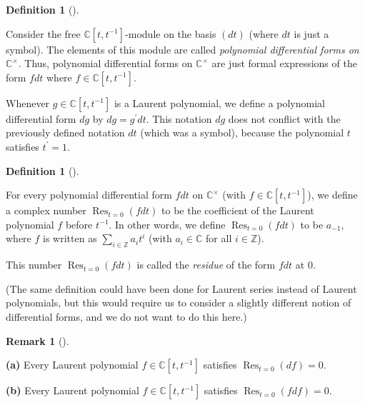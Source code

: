 \documentclass
[numbers=enddot,12pt,final,onecolumn,german,notitlepage]{scrartcl}%
\theoremstyle{definition}
\newtheorem{defi}[theo]{Definition}
\newenvironment{definition}[1][]
{\begin{defi}[#1]\begin{leftbar}}
{\end{leftbar}\end{defi}}
\newtheorem{remk}[theo]{Remark}
\newenvironment{remark}[1][]
{\begin{remk}[#1]\begin{leftbar}}
{\end{leftbar}\end{remk}}
\begin{document}
\begin{definition}
\label{def.diffform}Consider the free $\mathbb{C}\left[  t,t^{-1}\right]
$-module on the basis $\left(  dt\right)  $ (where $dt$ is just a symbol). The
elements of this module are called \textit{polynomial differential forms on
}$\mathbb{C}^{\times}$. Thus, polynomial differential forms on $\mathbb{C}%
^{\times}$ are just formal expressions of the form $fdt$ where $f\in
\mathbb{C}\left[  t,t^{-1}\right]  $.

Whenever $g\in\mathbb{C}\left[  t,t^{-1}\right]  $ is a Laurent polynomial, we
define a polynomial differential form $dg$ by $dg=g^{\prime}dt$. This notation
$dg$ does not conflict with the previously defined notation $dt$ (which was a
symbol), because the polynomial $t$ satisfies $t^{\prime}=1$.
\end{definition}

\begin{definition}
\label{def.res}For every polynomial differential form $fdt$ on $\mathbb{C}%
^{\times}$ (with $f\in\mathbb{C}\left[  t,t^{-1}\right]  $), we define a
complex number $\operatorname*{Res}\nolimits_{t=0}\left(  fdt\right)  $ to be
the coefficient of the Laurent polynomial $f$ before $t^{-1}$. In other words,
we define $\operatorname*{Res}\nolimits_{t=0}\left(  fdt\right)  $ to be
$a_{-1}$, where $f$ is written as $\sum\limits_{i\in\mathbb{Z}}a_{i}t^{i}$
(with $a_{i}\in\mathbb{C}$ for all $i\in\mathbb{Z}$).

This number $\operatorname*{Res}\nolimits_{t=0}\left(  fdt\right)  $ is called
the \textit{residue} of the form $fdt$ at $0$.
\end{definition}

(The same definition could have been done for Laurent series instead of
Laurent polynomials, but this would require us to consider a slightly
different notion of differential forms, and we do not want to do this here.)

\begin{remark}
\label{rmk.res}\textbf{(a)} Every Laurent polynomial $f\in\mathbb{C}\left[
t,t^{-1}\right]  $ satisfies $\operatorname*{Res}\nolimits_{t=0}\left(
df\right)  =0$.

\textbf{(b)} Every Laurent polynomial $f\in\mathbb{C}\left[  t,t^{-1}\right]
$ satisfies $\operatorname*{Res}\nolimits_{t=0}\left(  fdf\right)  =0$.
\end{remark}
\end{document}
